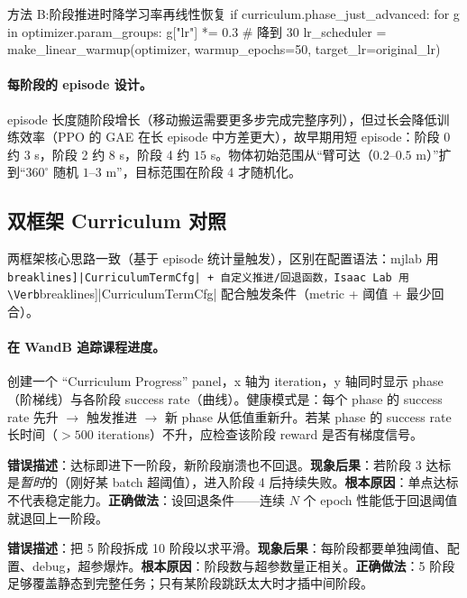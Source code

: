 \begin{codebox}[Python]{方法 B:阶段推进时降学习率再线性恢复}
if curriculum.phase_just_advanced:
    for g in optimizer.param_groups:
        g["lr"] *= 0.3                       # 降到 30%
    lr_scheduler = make_linear_warmup(optimizer, warmup_epochs=50, target_lr=original_lr)
\end{codebox}

\paragraph{每阶段的 episode 设计。}episode 长度随阶段增长（移动搬运需要更多步完成完整序列），但过长会降低训练效率（PPO 的 GAE 在长 episode 中方差更大），故早期用短 episode：阶段 0 约 $3$ s，阶段 2 约 $8$ s，阶段 4 约 $15$ s。物体初始范围从“臂可达（$0.2$--$0.5$ m）”扩到“$360^\circ$ 随机 $1$--$3$ m”，目标范围在阶段 4 才随机化。

\subsection{双框架 Curriculum 对照}
\label{sec:rlmc-wh-curr-api}

两框架核心思路一致（基于 episode 统计量触发），区别在配置语法：mjlab 用 \Verb[breaklines]|CurriculumTermCfg| + 自定义推进/回退函数，Isaac Lab 用 \Verb[breaklines]|CurriculumTermCfg| 配合触发条件（metric + 阈值 + 最少回合）。

\paragraph{在 WandB 追踪课程进度。}创建一个 “Curriculum Progress” panel，x 轴为 iteration，y 轴同时显示 phase（阶梯线）与各阶段 success rate（曲线）。健康模式是：每个 phase 的 success rate 先升 $\to$ 触发推进 $\to$ 新 phase 从低值重新升。若某 phase 的 success rate 长时间（$>500$ iterations）不升，应检查该阶段 reward 是否有梯度信号。

\begin{pitfall}[阶段推进不可逆]
\textbf{错误描述}：达标即进下一阶段，新阶段崩溃也不回退。\textbf{现象后果}：若阶段 3 达标是\emph{暂时}的（刚好某 batch 超阈值），进入阶段 4 后持续失败。\textbf{根本原因}：单点达标不代表稳定能力。\textbf{正确做法}：设回退条件——连续 $N$ 个 epoch 性能低于回退阈值就退回上一阶段。
\end{pitfall}

\begin{pitfall}
\textbf{错误描述}：把 5 阶段拆成 10 阶段以求平滑。\textbf{现象后果}：每阶段都要单独阈值、配置、debug，超参爆炸。\textbf{根本原因}：阶段数与超参数量正相关。\textbf{正确做法}：5 阶段足够覆盖静态到完整任务；只有某阶段跳跃太大时才插中间阶段。
\end{pitfall}

